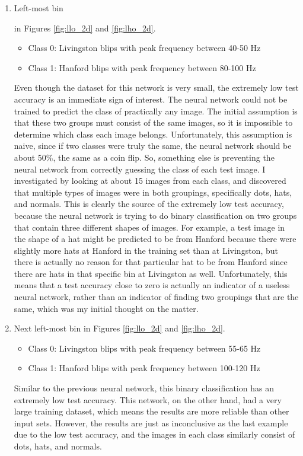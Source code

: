\documentclass[a4paper]{article}
\begin{document}
\begin{enumerate}
	\item \hypertarget{binary}{Left-most bin} in Figures \ref{fig:llo_2d} and \ref{fig:lho_2d}.
	\begin{itemize}
		\item Class 0: Livingston blips with peak frequency between 40-50 Hz
		\item Class 1: Hanford blips with peak frequency between 80-100 Hz
	\end{itemize} Even though the dataset for this network is very small, the extremely low test accuracy is an immediate sign of interest. The neural network could not be trained to predict the class of practically any image. The initial assumption is that these two groups must consist of the same images, so it is impossible to determine which class each image belongs. Unfortunately, this assumption is naive, since if two classes were truly the same, the neural network should be about 50\%, the same as a coin flip. So, something else is preventing the neural network from correctly guessing the class of each test image. I investigated by looking at about 15 images from each class, and discovered that multiple types of images were in both groupings, specifically dots, hats, and normals. This is clearly the source of the extremely low test accuracy, because the neural network is trying to do binary classification on two groups that contain three different shapes of images. For example, a test image in the shape of a hat might be predicted to be from Hanford because there were slightly more hats at Hanford in the training set than at Livingston, but there is actually no reason for that particular hat to be from Hanford since there are hats in that specific bin at Livingston as well. Unfortunately, this means that a test accuracy close to zero is actually an indicator of a useless neural network, rather than an indicator of finding two groupings that are the same, which was my initial thought on the matter. 
	
	\item Next left-most bin in Figures \ref{fig:llo_2d} and \ref{fig:lho_2d}.
	\begin{itemize}
		\item Class 0: Livingston blips with peak frequency between 55-65 Hz
		\item Class 1: Hanford blips with peak frequency between 100-120 Hz
	\end{itemize} Similar to the previous neural network, this binary classification has an extremely low test accuracy. This network, on the other hand, had a very large training dataset, which means the results are more reliable than other input sets. However, the results are just as inconclusive as the last example due to the low test accuracy, and the images in each class similarly consist of dots, hats, and normals.


\end{enumerate}
\end{document}
